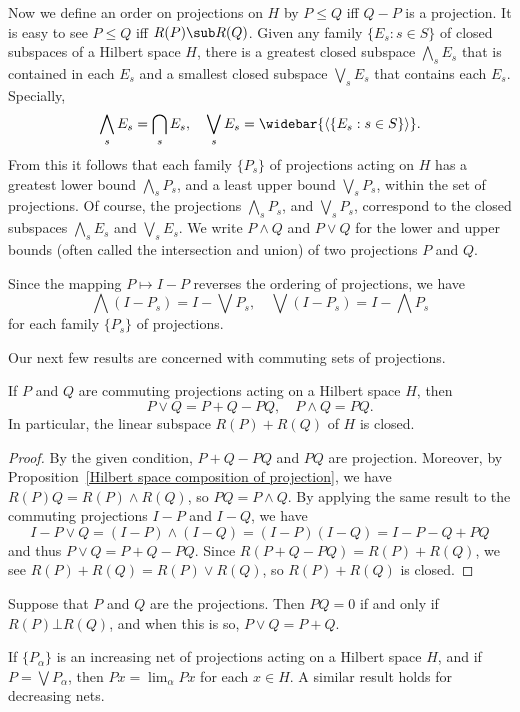 Now we define an order on projections on $H$ by $P\leq Q$ iff $Q-P$ is a projection. It is easy to see $P\leq Q$ iff $R(P)\sub R(Q)$. Given any family $\{E_s:s\in S\}$ of closed subspaces of a Hilbert space $H$, there is a greatest closed subspace $\bigwedge_sE_s$ that is contained in each $E_s$ and a smallest closed subspace $\bigvee_sE_s$ that contains each $E_s$. Specially,
\[\bigwedge_sE_s=\bigcap_sE_s,\quad \bigvee_sE_s=\widebar{\langle\{ E_s:s\in S\}\rangle}.\]
From this it follows that each family $\{P_s\}$ of projections acting on $H$ has a greatest lower bound $\bigwedge_sP_s$, and a least upper bound $\bigvee_sP_s$, within the set of projections. Of course, the projections $\bigwedge_sP_s$, and $\bigvee_sP_s$, correspond to the closed subspaces $\bigwedge_sE_s$ and $\bigvee_sE_s$. We write $P\wedge Q$ and $P\vee Q$ for the lower and upper bounds (often called the intersection and union) of two projections $P$ and $Q$.\par
Since the mapping $P\mapsto I-P$ reverses the ordering of projections, we have
\[\bigwedge(I-P_s)=I-\bigvee P_s,\quad\bigvee(I-P_s)=I-\bigwedge P_s\]
for each family $\{P_s\}$ of projections.\par
Our next few results are concerned with commuting sets of projections.
\begin{proposition}\label{Hilbert space union and inters of commuting projection}
If $P$ and $Q$ are commuting projections acting on a Hilbert space $H$, then
\[P\vee Q=P+Q-PQ,\quad P\wedge Q=PQ.\]
In particular, the linear subspace $R(P)+R(Q)$ of $H$ is closed.
\end{proposition}
\begin{proof}
By the given condition, $P+Q-PQ$ and $PQ$ are projection. Moreover, by Proposition~\ref{Hilbert space composition of projection}, we have $R(P)Q=R(P)\wedge R(Q)$, so $PQ=P\wedge Q$. By applying the same result to the commuting projections $I-P$ and $I-Q$, we have
\[I-P\vee Q=(I-P)\wedge(I-Q)=(I-P)(I-Q)=I-P-Q+PQ\]
and thus $P\vee Q=P+Q-PQ$. Since $R(P+Q-PQ)=R(P)+R(Q)$, we see $R(P)+R(Q)=R(P)\vee R(Q)$, so $R(P)+R(Q)$ is closed.
\end{proof}
\begin{corollary}
Suppose that $P$ and $Q$ are the projections. Then $PQ=0$ if and only if $R(P)\bot R(Q)$, and when this is so, $P\vee Q=P+Q$.
\end{corollary}
\begin{proposition}\label{Hilbert space increasing projection}
If $\{P_\alpha\}$ is an increasing net of projections acting on a Hilbert space $H$, and if $P=\bigvee P_\alpha$, then $Px=\lim_\alpha Px$ for each $x\in H$. A similar result holds for decreasing nets.
\end{proposition}
